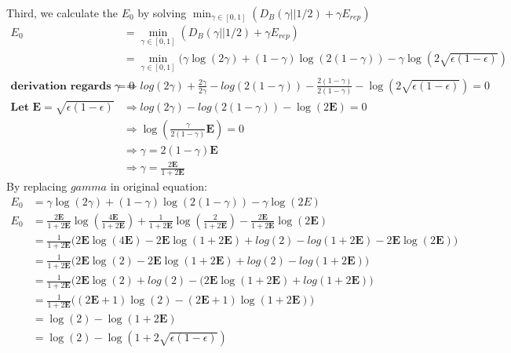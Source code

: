 \documentclass[
  course = {{EE623 Information Theory}},
  quartile = {{Fall 2020}},
  assignment = 8,
  name = {{Mohammad Mahdi Rahimi}},
  studentnumber = {{20208244}},
  email = {{mahi@kaist.ac.kr}},
  firstexercise = 1
]{aga-homework}
\begin{document}
Third, we calculate the $E_0$ by solving $\min_{\gamma \in [0,1]}(D_B(\gamma || 1/2) + \gamma E_{rep})$
\begin{equation} \label{eq8}
\begin{split}
E_0 & = \min_{\gamma \in [0,1]}(D_B(\gamma || 1/2) + \gamma E_{rep})\\
& = \min_{\gamma \in [0,1]}(\gamma \log(2\gamma) + (1-\gamma) \log(2(1-\gamma)) -\gamma\log{(2\sqrt{\epsilon(1 - \epsilon)})} \\
\textbf{derivation regards to $\gamma$} = 0 & \Rightarrow log(2\gamma) + \frac{2\gamma}{2\gamma} - log(2(1-\gamma)) - \frac{2(1-\gamma)}{2(1-\gamma)} - \log{(2\sqrt{\epsilon(1 - \epsilon)})} = 0\\
\textbf{Let } \mathbf{E} = \sqrt{\epsilon(1 - \epsilon)} & \Rightarrow log(2\gamma) - log(2(1-\gamma)) - \log(2\mathbf{E}) = 0\\
& \Rightarrow \log(\frac{\gamma}{2(1-\gamma)}\mathbf{E}) = 0\\
& \Rightarrow \gamma = 2(1-\gamma)\mathbf{E}\\
& \Rightarrow \gamma = \frac{2\mathbf{E}}{1 + 2\mathbf{E}}
\end{split}
\end{equation}
By replacing $gamma$ in original equation:
\begin{equation} \label{eq9}
\begin{split}
E_0 & = \gamma \log(2\gamma) + (1-\gamma) \log(2(1-\gamma)) -\gamma\log{(2E)} \\
E_0 & = \frac{2\mathbf{E}}{1 + 2\mathbf{E}} \log(\frac{4\mathbf{E}}{1 + 2\mathbf{E}}) + \frac{1}{1 + 2\mathbf{E}} \log(\frac{2}{1 + 2\mathbf{E}}) -\frac{2\mathbf{E}}{1 + 2\mathbf{E}}\log{(2\mathbf{E})} \\
& = \frac{1}{1 + 2\mathbf{E}}\Big(2\mathbf{E}\log(4\mathbf{E}) - 2\mathbf{E}\log(1 + 2\mathbf{E}) + log(2) - log(1 + 2\mathbf{E}) - 2\mathbf{E}\log(2\mathbf{E})\Big)\\
& = \frac{1}{1 + 2\mathbf{E}}\Big(2\mathbf{E}\log(2) - 2\mathbf{E}\log(1 + 2\mathbf{E}) + log(2) - log(1 + 2\mathbf{E})\Big)\\
& = \frac{1}{1 + 2\mathbf{E}}\Big(2\mathbf{E}\log(2) + log(2) - (2\mathbf{E}\log(1 + 2\mathbf{E}) + log(1 + 2\mathbf{E})\Big)\\
& = \frac{1}{1 + 2\mathbf{E}}\Big((2\mathbf{E} + 1)\log(2) - (2\mathbf{E} + 1)\log(1 + 2\mathbf{E})\Big)\\
& = \log(2) - \log(1 + 2\mathbf{E})\\
& = \log(2) - \log(1 + 2\sqrt{\epsilon(1 - \epsilon)})\\
\end{split}
\end{equation}
\end{document}

